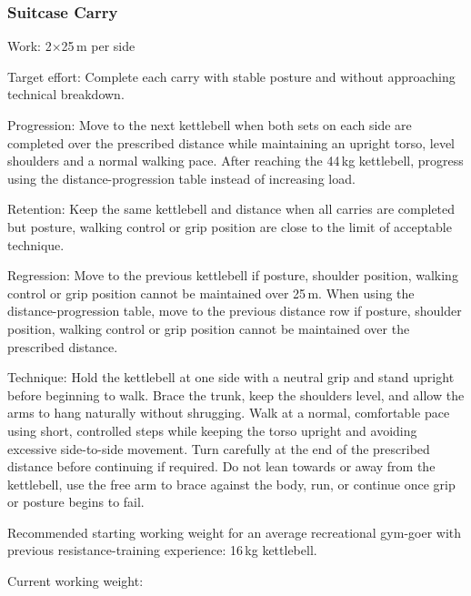 \documentclass[11pt,a4paper]{article}
\begin{document}
\newpage
\subsubsection{Suitcase Carry}

Work: 2$\times$25\,m per side

Target effort: Complete each carry with stable posture and without approaching technical breakdown.

Progression: Move to the next kettlebell when both sets on each side are completed over the prescribed distance while maintaining an upright torso, level shoulders and a normal walking pace. After reaching the 44\,kg kettlebell, progress using the distance-progression table instead of increasing load.

Retention: Keep the same kettlebell and distance when all carries are completed but posture, walking control or grip position are close to the limit of acceptable technique.

Regression: Move to the previous kettlebell if posture, shoulder position, walking control or grip position cannot be maintained over 25\,m. When using the distance-progression table, move to the previous distance row if posture, shoulder position, walking control or grip position cannot be maintained over the prescribed distance.

Technique: Hold the kettlebell at one side with a neutral grip and stand upright before beginning to walk. Brace the trunk, keep the shoulders level, and allow the arms to hang naturally without shrugging. Walk at a normal, comfortable pace using short, controlled steps while keeping the torso upright and avoiding excessive side-to-side movement. Turn carefully at the end of the prescribed distance before continuing if required. Do not lean towards or away from the kettlebell, use the free arm to brace against the body, run, or continue once grip or posture begins to fail.

Recommended starting working weight for an average recreational gym-goer with previous resistance-training experience: 16\,kg kettlebell.

Current working weight:
\end{document}
